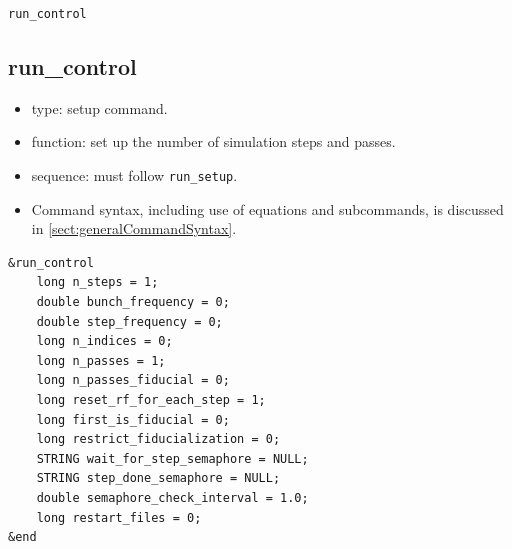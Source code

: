 \documentclass[11pt]{article}
\begin{document}
\newpage
\begin{center}{\Large\verb|run_control|}\end{center}
\subsection{run\_control \label{subsec:runcontrol}}

\begin{itemize}
\item type: setup command.
\item function: set up the number of simulation steps and passes.
\item sequence: must follow \verb|run_setup|.
\item Command syntax, including use of equations and subcommands, is discussed in \ref{sect:generalCommandSyntax}.
\end{itemize}

\begin{verbatim}
&run_control
    long n_steps = 1;
    double bunch_frequency = 0;
    double step_frequency = 0;
    long n_indices = 0;
    long n_passes = 1;
    long n_passes_fiducial = 0;
    long reset_rf_for_each_step = 1;
    long first_is_fiducial = 0;
    long restrict_fiducialization = 0;
    STRING wait_for_step_semaphore = NULL;
    STRING step_done_semaphore = NULL;
    double semaphore_check_interval = 1.0;
    long restart_files = 0;
&end
\end{verbatim}
\end{document}
